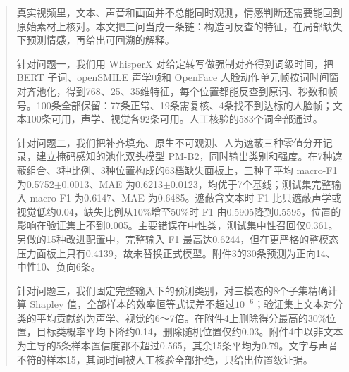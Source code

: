 \begin{abstract}
真实视频里，文本、声音和画面并不总能同时观测，情感判断还需要能回到原始素材上核对。本文把三问当成一条链：构造可反查的特征，在局部缺失下预测情感，再给出可回溯的解释。

针对问题一，我们用 WhisperX 对给定转写做强制对齐得到词级时间，把 BERT 子词、openSMILE 声学帧和 OpenFace 人脸动作单元帧按词时间窗对齐池化，得到768、25、35维特征，每个位置都能反查到原词、秒数和帧号。100条全部保留：77条正常、19条需复核、4条找不到达标的人脸帧；文本100条可用，声学、视觉各92条可用。人工核验的583个词全部通过。

针对问题二，我们把补齐填充、原生不可观测、人为遮蔽三种零值分开记录，建立掩码感知的池化双头模型 PM-B2，同时输出类别和强度。在7种遮蔽组合、3种比例、3种位置构成的63档缺失面板上，三种子平均 macro-F1 为0.5752$\pm$0.0013、MAE 为0.6213$\pm$0.0123，均优于7个基线；测试集完整输入 macro-F1 为0.6147、MAE 为0.6485。遮蔽含文本时 F1 比只遮蔽声学或视觉低约0.04，缺失比例从10\%增至50\%时 F1 由0.5905降到0.5595，位置的影响在验证集上不到0.005。主要错误在中性类，测试集中性召回仅0.361。另做的15种改进配置中，完整输入 F1 最高达0.6244，但在更严格的整模态压力面板上只有0.4139，故未替换正式模型。附件3的30条预测为正向14、中性10、负向6条。

针对问题三，我们固定完整输入下的预测类别，对三模态的8个子集精确计算 Shapley 值，全部样本的效率恒等式误差不超过$10^{-6}$；验证集上文本对分类的平均贡献约为声学、视觉的6～7倍。在附件4上删除得分最高的30\%位置，目标类概率平均下降约0.14，删除随机位置仅约0.03。附件4中以非文本为主导的5条样本置信度都不超过0.565，其余15条平均为0.79。文字与声音不符的样本15，其词时间被人工核验全部拒绝，只给出位置级证据。

\end{abstract}
